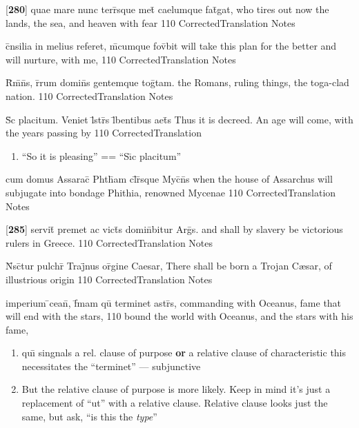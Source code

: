 \latline
  {[\textbf{280}] quae mare nunc terr\={}sque met\={} caelumque fat\={\macron {\i}}gat,}
  { who tires out now the lands, the sea, and  heaven with fear }
  {110}
  { CorrectedTranslation }
  { Notes }


\latline
  {c\={}nsilia in melius referet, m\={}cumque fov\={}bit}
  { will take this plan for the better and will nurture, with me, }
  {110}
  { CorrectedTranslation }
  { Notes }


\latline
  {R\={}m\={}n\={}s, r\={}rum domin\={}s gentemque tog\={}tam.}
  { the Romans, ruling things, the toga-clad nation. }
  {110}
  { CorrectedTranslation }
  { Notes }


\latline
  {S\={\macron {\i}}c placitum.  Veniet l\={}str\={\macron {\i}}s l\={}bentibus aet\={}s}
  { Thus it is decreed.  An age will come, with the years passing by   }
  {110}
  { CorrectedTranslation }
  { \begin{enumerate}
  	\item ``So it is pleasing'' == ``S\={\i}c placitum''
  \end{enumerate} }


\latline
  {cum domus Assarac\={\macron {\i}} Phth\={\macron {\i}}am cl\={}r\={}sque Myc\={}n\={}s}
  { when the house of Assarchus will subjugate into bondage Phithia, renowned Mycenae }
  {110}
  { CorrectedTranslation }
  { Notes }


\latline
  {[\textbf{285}] servit\={} premet ac vict\={\macron {\i}}s domin\={}bitur Arg\={\macron {\i}}s.}
  { and shall by slavery be victorious rulers in Greece. }
  {110}
  { CorrectedTranslation }
  { Notes }


\latline
  {N\={}sc\={}tur pulchr\={} Traj\={}nus or\={\macron {\i}}gine Caesar,}
  { There shall be born a Trojan C{\ae}sar, of illustrious origin }
  {110}
  { CorrectedTranslation }
  { Notes }


\latline
  {imperium \={}cean\={}, f\={}mam qu\={\macron {\i}} terminet astr\={\macron {\i}}s,}
  { commanding with Oceanus, fame that will end with the stars, }
  {110}
  { bound the world with Oceanus, and the stars with his fame, }
  { \begin{enumerate}
  	\item qu\={\i} singnals a rel. clause of purpose \textbf{or} a relative clause of characteristic  this necessitates the ``terminet'' --- subjunctive
  	\item But the relative clause of purpose is more likely.  Keep in mind it's just a replacement of ``ut'' with a relative clause.  Relative clause looks just the same, but ask, ``is this the \emph{type}''
  \end{enumerate} }


